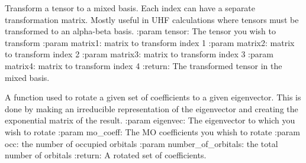 \documentclass[letterpaper,10pt,english]{sphinxmanual}
\begin{document}

\begin{fulllineitems}
\label{\detokenize{transform:hf.utilities.transform.mix_tensor_to_basis_transform}}
Transform a tensor to a mixed basis. Each index can have a separate transformation matrix.
Mostly useful in UHF calculations where tensors must be transformed to an alpha-beta basis.
:param tensor: The tensor you wish to transform
:param matrix1: matrix to transform index 1
:param matrix2: matrix to transform index 2
:param matrix3: matrix to transform index 3
:param matrix4: matrix to transform index 4
:return: The transformed tensor in the mixed basis.

\end{fulllineitems}


\begin{fulllineitems}
\label{\detokenize{transform:hf.utilities.transform.rotate_to_eigenvec}}
A function used to rotate a given set of coefficients to a given eigenvector.
This is done by making an irreducible representation of the eigenvector and creating the exponential matrix
of the result.
:param eigenvec: The eigenvector to which you wish to rotate
:param mo\_coeff: The MO coefficients you whish to rotate
:param occ: the number of occupied orbitals
:param number\_of\_orbitals: the total number of orbitals
:return: A rotated set of coefficients.

\end{fulllineitems}

\end{document}
